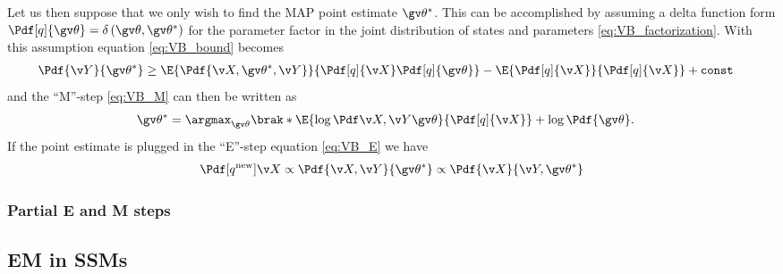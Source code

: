 Let us then suppose that we only wish to find the MAP point estimate $\Th^*$. This can be accomplished
by assuming a delta function form $\Pdf[q]{\Th}=\delta\left(\Th,\Th^*\right)$ for the parameter factor in the
joint distribution of states and parameters \eqref{eq:VB_factorization}.
With this assumption equation \eqref{eq:VB_bound} becomes
\begin{align}
	\Pdf{\Y}{\Th^*} &\geq \E{\Pdf{\X,\Th^*,\Y}}{\Pdf[q]{\X}\Pdf[q]{\Th}} - \E{\Pdf[q]{\X}}{\Pdf[q]{\X}} + \mathtt{const}
	\label{eq:VB_MAP_boundl}
\end{align}
and the ``M''-step \eqref{eq:VB_M} can then be written as
\begin{align}
	\Th^* &= \argmax_{\Th}\brak*{\E{\log\cLH}{\Pdf[q]{\X}}+\log\Pdf{\Th}}.
	\label{tablelabel}
\end{align}
If the point estimate is plugged in the ``E''-step equation \eqref{eq:VB_E} we have
\begin{align}
	\Pdf[q^{\text{new}}]{\X}\propto \Pdf{\X,\Y}{\Th^*} \propto \Pdf{\X}{\Y,\Th^*} 
	\label{tablelabel}
\end{align}

\subsubsection{Partial E and M steps}


\subsection{EM in SSMs}%
\label{sec:EM_SSM}

